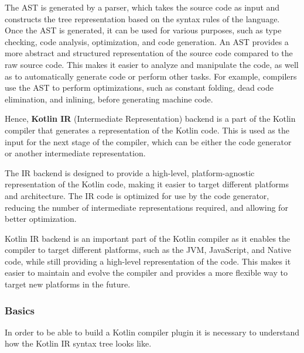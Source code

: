 The AST is generated by a parser, which takes the source code as input and constructs the tree representation based on the syntax rules of the language. Once the AST is generated, it can be used for various purposes, such as type checking, code analysis, optimization, and code generation.\newline
An AST provides a more abstract and structured representation of the source code compared to the raw source code. This makes it easier to analyze and manipulate the code, as well as to automatically generate code or perform other tasks. For example, compilers use the AST to perform optimizations, such as constant folding, dead code elimination, and inlining, before generating machine code.

Hence, \textbf{Kotlin IR} (Intermediate Representation) backend is a part of the Kotlin compiler that generates a representation of the Kotlin code. This is used as the input for the next stage of the compiler, which can be either the code generator or another intermediate representation.

The IR backend is designed to provide a high-level, platform-agnostic representation of the Kotlin code, making it easier to target different platforms and architecture. The IR code is optimized for use by the code generator, reducing the number of intermediate representations required, and allowing for better optimization.

Kotlin IR backend is an important part of the Kotlin compiler as it enables the compiler to target different platforms, such as the JVM, JavaScript, and Native code, while still providing a high-level representation of the code. This makes it easier to maintain and evolve the compiler and provides a more flexible way to target new platforms in the future.

\subsubsection{Basics}\label{section:compiler_plugin_basics}
In order to be able to build a Kotlin compiler plugin it is necessary to understand how the Kotlin IR syntax tree looks like.

